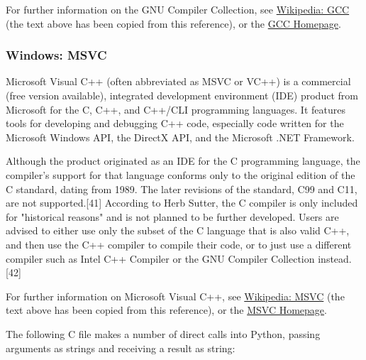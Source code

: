 \vpara
For further information on the GNU Compiler Collection, see \href{http://en.wikipedia.org/wiki/GNU_Compiler_Collection}{Wikipedia: GCC} (the text above has been copied from this reference), or the  \href{http://gcc.gnu.org/}{GCC Homepage}.


\subsubsection{Windows: MSVC}
Microsoft Visual C++ (often abbreviated as MSVC or VC++) is a commercial (free version available), integrated development environment (IDE) product from Microsoft for the C, C++, and C++/CLI programming languages. It features tools for developing and debugging C++ code, especially code written for the Microsoft Windows API, the DirectX API, and the Microsoft .NET Framework.

\vpara
Although the product originated as an IDE for the C programming language, the compiler's support for that language conforms only to the original edition of the C standard, dating from 1989. The later revisions of the standard, C99 and C11, are not supported.[41] According to Herb Sutter, the C compiler is only included for "historical reasons" and is not planned to be further developed. Users are advised to either use only the subset of the C language that is also valid C++, and then use the C++ compiler to compile their code, or to just use a different compiler such as Intel C++ Compiler or the GNU Compiler Collection instead.[42]

\vpara
For further information on Microsoft Visual C++, see \href{http://en.wikipedia.org/wiki/Visual_C\%2B\%2B}{Wikipedia: MSVC} (the text above has been copied from this reference), or the  \href{http://msdn.microsoft.com/en-us/vstudio/hh386302}{MSVC Homepage}.


\vpara
The following C file makes a number of direct calls into Python, passing arguments as strings and receiving a result as string:

